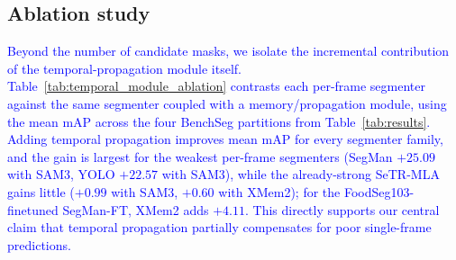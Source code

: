 \documentclass[preprint,12pt]{elsarticle}
\newcommand{\change}[1]{\textcolor{blue}{#1}}
\begin{document}



\subsection{Ablation study}
\change{Beyond the number of candidate masks, we isolate the incremental contribution of the temporal-propagation module itself. Table~\ref{tab:temporal_module_ablation} contrasts each per-frame segmenter against the same segmenter coupled with a memory/propagation module, using the mean mAP across the four BenchSeg partitions from Table~\ref{tab:results}. Adding temporal propagation improves mean mAP for every segmenter family, and the gain is largest for the weakest per-frame segmenters (SegMan $+25.09$ with SAM3, YOLO $+22.57$ with SAM3), while the already-strong SeTR-MLA gains little ($+0.99$ with SAM3, $+0.60$ with XMem2); for the FoodSeg103-finetuned SegMan-FT, XMem2 adds $+4.11$. This directly supports our central claim that temporal propagation partially compensates for poor single-frame predictions.}
\end{document}
